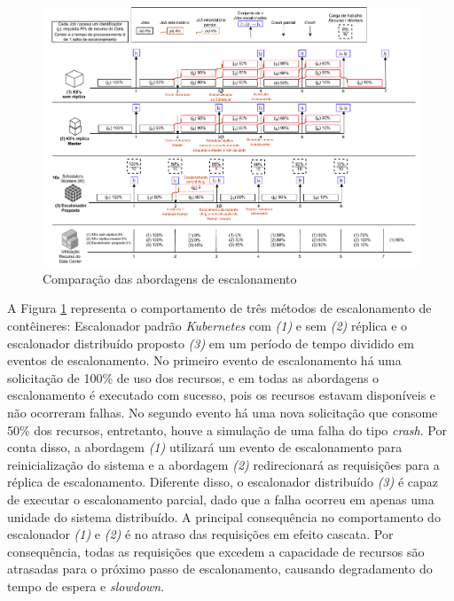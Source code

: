 \begin{figure}[h!]
	\caption{\label{fig:comp_sched}Comparação das abordagens de escalonamento}
	\centering
	\includegraphics[width=1\linewidth]{assets/schedule-proposal.drawio.pdf}
\end{figure}

A Figura \ref{fig:comp_sched} representa o comportamento de três métodos de escalonamento de contêineres: Escalonador padrão \textit{Kubernetes} com \textit{(1)} e sem \textit{(2)} réplica e o escalonador distribuído proposto \textit{(3)} em um período de tempo dividido em eventos de escalonamento. No primeiro evento de escalonamento há uma solicitação de 100\% de uso dos recursos, e em todas as abordagens o escalonamento é executado com sucesso, pois os recursos estavam disponíveis e não ocorreram falhas. No segundo evento há uma nova solicitação que consome 50\% dos recursos, entretanto, houve a simulação de uma falha do tipo \textit{crash}. Por conta disso, a abordagem \textit{(1)} utilizará um evento de escalonamento para reinicialização do sistema e a abordagem \textit{(2)} redirecionará as requisições para a réplica de escalonamento. Diferente disso, o escalonador distribuído \textit{(3)} é capaz de executar o escalonamento parcial, dado que a falha ocorreu em apenas uma unidade do sistema distribuído. A principal consequência no comportamento do escalonador \textit{(1)} e \textit{(2)} é no atraso das requisições em efeito cascata. Por consequência, todas as requisições que excedem a capacidade de recursos são atrasadas para o próximo passo de escalonamento, causando degradamento do tempo de espera e \textit{slowdown}.

